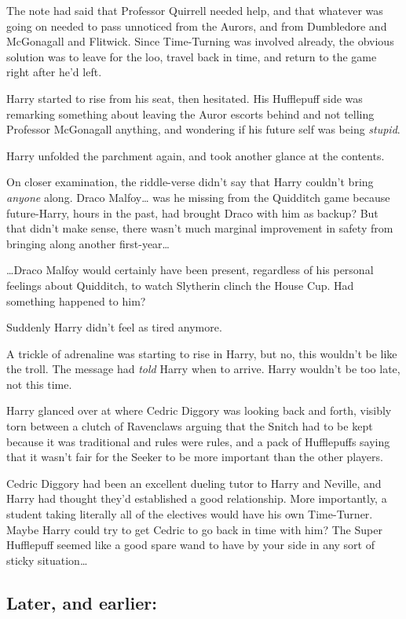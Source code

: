 The note had said that Professor Quirrell needed help, and that whatever was 
going on needed to pass unnoticed from the Aurors, and from Dumbledore and 
McGonagall and Flitwick. Since Time-Turning was involved already, the obvious 
solution was to leave for the loo, travel back in time, and return to the game 
right after he'd left.

Harry started to rise from his seat, then hesitated. His Hufflepuff side was 
remarking something about leaving the Auror escorts behind and not telling 
Professor McGonagall anything, and wondering if his future self was being 
\emph{stupid}.

Harry unfolded the parchment again, and took another glance at the contents.

On closer examination, the riddle-verse didn't say that Harry couldn't bring 
\emph{anyone} along. Draco Malfoy{\ldots} was he missing from the Quidditch 
game because future-Harry, hours in the past, had brought Draco with him as 
backup? But that didn't make sense, there wasn't much marginal improvement in 
safety from bringing along another first-year{\ldots}

{\ldots}Draco Malfoy would certainly have been present, regardless of his 
personal feelings about Quidditch, to watch Slytherin clinch the House Cup. Had 
something happened to him?

Suddenly Harry didn't feel as tired anymore.

A trickle of adrenaline was starting to rise in Harry, but no, this wouldn't be 
like the troll. The message had \emph{told} Harry when to arrive. Harry 
wouldn't be too late, not this time.

Harry glanced over at where Cedric Diggory was looking back and forth, visibly 
torn between a clutch of Ravenclaws arguing that the Snitch had to be kept 
because it was traditional and rules were rules, and a pack of Hufflepuffs 
saying that it wasn't fair for the Seeker to be more important than the other 
players.

Cedric Diggory had been an excellent dueling tutor to Harry and Neville, and 
Harry had thought they'd established a good relationship. More importantly, a 
student taking literally all of the electives would have his own Time-Turner. 
Maybe Harry could try to get Cedric to go back in time with him? The Super 
Hufflepuff seemed like a good spare wand to have by your side in any sort of 
sticky situation{\ldots}
\sbreak
\vspace{-2\baselineskip}
\subsection{Later, and earlier:}

